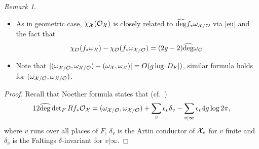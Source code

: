 \documentclass[]{amsart}
\newcommand{\CO}{{\mathcal {O}}} \newcommand{\CP}{{\mathcal {P}}}
\newcommand{\wh}{\widehat}
\theoremstyle{plain}
\theoremstyle{remark} \newtheorem{remark}[thm]{Remark}
\theoremstyle{remark} \newtheorem{exercise}{Exercise}
\theoremstyle{remark} \newtheorem{example}{Example}
\numberwithin{equation}{section}
\begin{document}
\begin{remark}\label{Noermk}
  \
  \begin{itemize}
    \item [(i)]As in geometric case, $\chi_{\CX}(\CO_{\CX})$ is closely related to $\wh{\deg}f_*\omega_{\CX/\CO}$ via \eqref{eu} and the fact that \[\chi_{\CO}(f_*\omega_{\CX})-\chi_{\CO}(f_*\omega_{\CX/\CO})
  =(2g-2)\wh{\deg}\omega_{\CO}
 .\]
 \item [(ii)]Note that $|(\omega_{\CX/\CO},\omega_{\CX/\CO})-(\omega_{\CX},\omega_{\CX})|=O(g\log|D_F|)$, similar formula holds for $(\omega_{\CX/\CO},\omega_{\CX/\CO})$.
  \end{itemize}
\end{remark}
\begin{proof}
Recall that Noether formula states that (cf.~\cite[Sec.~4.6]{Soule})
\begin{equation}\label{noe}12\wh{\deg}\det\nolimits_{F}Rf_*\CO_{\CX}=(\omega_{\CX/\CO},\omega_{\CX/\CO})+\sum_{v}\epsilon_v\delta_v-\sum_{v|\infty}\epsilon_v4g\log 2\pi,\end{equation}where 
$v$ runs over all places of $F$, $\delta_v$ is the Artin conductor of ${\mathcal {X}}_v$ for $v$ finite and $\delta_v$ is the Faltings $\delta$-invariant for $v|\infty$.


\end{proof}
\end{document}
